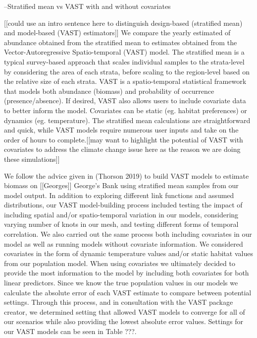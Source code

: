 \documentclass[
  12pt,
]{article}
\begin{document}
--Stratified mean vs VAST with and without covariates

{[}{[}could use an intro sentence here to distinguish design-based (stratified mean) and model-based (VAST) estimators{]}{]} We compare the yearly estimated of abundance obtained from the stratified mean to estimates obtained from the Vector-Autoregressive Spatio-temporal (VAST) model. The stratified mean is a typical survey-based approach that scales individual samples to the strata-level by considering the area of each strata, before scaling to the region-level based on the relative size of each strata. VAST is a spatio-temporal statistical framework that models both abundance (biomass) and probability of occurrence (presence/absence). If desired, VAST also allows users to include covariate data to better inform the model. Covariates can be static (eg. habitat preferences) or dynamics (eg. temperature). The stratified mean calculations are straightforward and quick, while VAST models require numerous user inputs and take on the order of hours to complete.{[}{[}may want to highlight the potential of VAST with covariates to address the climate change issue here as the reason we are doing these simulations{]}{]}

We follow the advice given in (Thorson 2019) to build VAST models to estimate biomass on {[}{[}Georges{]}{]} George's Bank using stratified mean samples from our model output. In addition to exploring different link functions and assumed distributions, our VAST model-building process included testing the impact of including spatial and/or spatio-temporal variation in our models, considering varying number of knots in our mesh, and testing different forms of temporal correlation. We also carried out the same process both including covariates in our model as well as running models without covariate information. We considered covariates in the form of dynamic temperature values and/or static habitat values from our population model. When using covariates we ultimately decided to provide the most information to the model by including both covariates for both linear predictors. Since we know the true population values in our models we calculate the absolute error of each VAST estimate to compare between potential settings. Through this process, and in consultation with the VAST package creator, we determined setting that allowed VAST models to converge for all of our scenarios while also providing the lowest absolute error values. Settings for our VAST models can be seen in Table ???.
\end{document}
